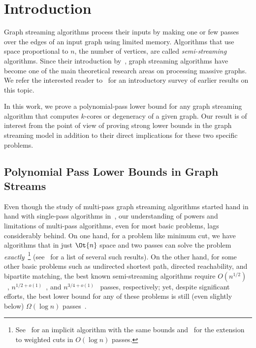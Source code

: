 
\section{Introduction} \label{sec:intro}


Graph streaming algorithms process their inputs by making one or few passes
over the edges of an input graph using limited memory.
Algorithms that use space proportional to $n$, the number of vertices, are
called \emph{semi-streaming} algorithms.
Since their introduction by~\cite{FeigenbaumKMSZ05}, graph streaming algorithms
have become one of the main theoretical research areas on  processing massive
graphs.
We refer the interested
reader to~\cite{McGregor14} for an introductory survey of earlier results on
this topic. 

In this work, we prove a polynomial-pass lower bound for any graph streaming algorithm
that computes $k$-cores or degeneracy of a given graph.  Our result is of interest from the point of view of proving strong lower bounds in the graph streaming model in addition to their direct implications 
for these two specific problems. 

\subsection{Polynomial Pass Lower Bounds in Graph Streams}\label{sec:poly-pass}

Even though the study of multi-pass graph streaming algorithms started hand in hand with single-pass algorithms in~\cite{FeigenbaumKMSZ05}, our understanding of 
powers and limitations of multi-pass algorithms, even for most basic problems, lags considerably behind. On one hand, for a problem like minimum cut, 
we have algorithms that in just $\Ot{n}$ space and two passes can solve the problem \emph{exactly}~\cite{AssadiD21}\footnote{See~\cite{RubinsteinSW18} for an implicit algorithm with the same bounds and~\cite{MukhopadhyayN20} for the extension to 
weighted cuts in $O(\log{n})$ passes.} (see~\cite[Table 1]{AssadiCK19} for a list of several such results). On the other hand, for some other basic problems such as undirected shortest path, directed reachability, and bipartite matching, the best known semi-streaming algorithms require $O({n^{1/2}})$~\cite{ChangFHT20}, 
$n^{1/2+o(1)}$~\cite{LiuJS19,AssadiJJST22}, and $n^{3/4+o(1)}$~\cite{AssadiJJST22} passes, respectively; yet, despite significant efforts, the best lower bound for any of these problems
is still (even slightly below) $\Omega(\log{n})$ passes~\cite{GuruswamiO13,ChakrabartiGMV20,AssadiR20,ChenKPSSY21}. 

